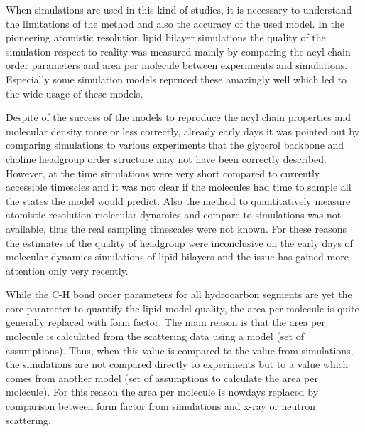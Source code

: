 \documentclass[aps,prl,superscriptaddress,twocolumn]{revtex4}
\begin{document}
When simulations are used in this kind of studies, it is necessary to understand
the limitations of the method and also the accuracy of the used model.
In the pioneering atomistic resolution lipid bilayer simulations the quality of
the simulation respect to reality was measured mainly by comparing the 
acyl chain order parameters and area per molecule between experiments and
simulations. Especially some simulation models repruced these amazingly well
which led to the wide usage of these models.


Despite of the success of the models to reproduce the acyl chain properties and
molecular density more or less correctly, already early days it was pointed out
by comparing simulations to various experiments
that the glycerol backbone and choline headgroup order structure may not have been 
correctly described. However, at the time simulations were very short compared
to currently accessible timescles and it was not clear if the molecules had
time to sample all the states the model would predict. Also the method to 
quantitatively measure atomistic resolution molecular dynamics and compare to
simulations was not available, thus the real sampling timescales were not known.
For these reasons the estimates of the quality of headgroup were inconclusive on
the early days of molecular dynamics simulations of lipid bilayers and
the issue has gained more attention only very recently.

While the C-H bond order parameters for all hydrocarbon segments are yet the
core parameter to quantify the lipid model quality, the area per molecule 
is quite generally replaced with form factor.
The main reason is that the area per molecule is calculated from the scattering
data using a model (set of assumptions). Thus, when this value is compared to
the value from simulations, the simulations are not compared directly to experiments
but to a value which comes from another model (set of assumptions to calculate the
area per molecule). For this reason the area per molecule is nowdays replaced
by comparison between form factor from simulations and x-ray or neutron scattering.
\end{document}
